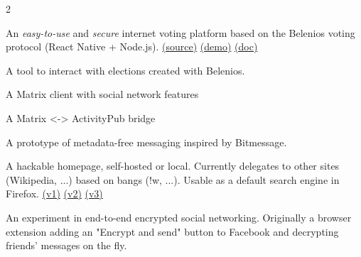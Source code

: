 \documentclass[10pt,a4paper,withhyper]{altacv}
\begin{document}
\begin{paracol}{2}
\newpage



An \textit{easy-to-use} and \textit{secure} internet voting platform based on the Belenios voting protocol (React Native + Node.js).
\href{https://github.com/mjal/scrutin}{(source)}
\href{https://scrutin.app/}{(demo)}
\href{https://docs.scrutin.app/}{(doc)}

\divider


A tool to interact with elections created with Belenios.

\divider


A Matrix client with social network features

\divider


A Matrix <-> ActivityPub bridge

\divider


A prototype of metadata-free messaging inspired by Bitmessage.

\divider


A hackable homepage, self-hosted or local. Currently delegates to other sites (Wikipedia, ...) based on bangs (!w, ...). Usable as a default search engine in Firefox.
\href{https://mjal.github.io/ami/}{(v1)}
\href{https://mjal.github.io/ami3d/}{(v2)}
\href{https://mjal.github.io/ami3/}{(v3)}

\divider


An experiment in end-to-end encrypted social networking. Originally a browser extension adding an "Encrypt and send" button to Facebook and decrypting friends' messages on the fly.

\medskip


\end{paracol}
\end{document}
